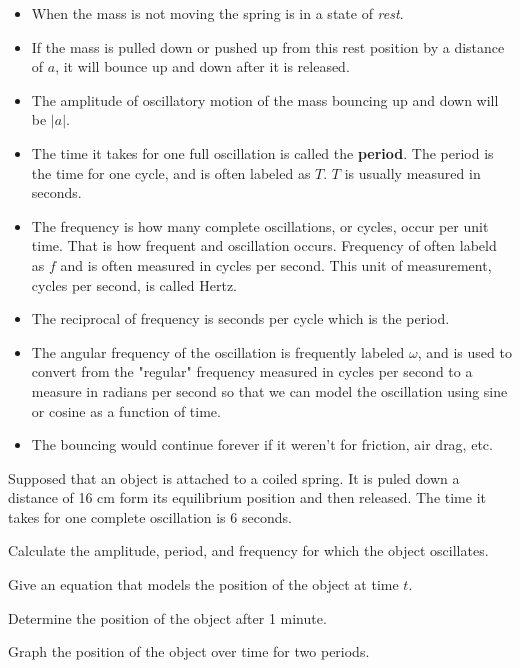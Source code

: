 \documentclass[paper=letter]{article}
\begin{document}
\begin{itemize}
	\item When the mass is not moving the spring is in a state of \emph{rest}.
	\item If the mass is pulled down or pushed up from this rest position by a distance of $a$, it will bounce up and down after it is released.
	\item The amplitude of oscillatory motion of the mass bouncing up and down will be $|a|$.
	\item The time it takes for one full oscillation is called the \textbf{period}.  The period is the time for one cycle, and is often labeled as $T$.  $T$ is usually measured in seconds.
	\item The frequency is how many complete oscillations, or cycles, occur per unit time.  That is how frequent and oscillation occurs.  Frequency of often labeld as $f$ and is often measured in cycles per second.  This unit of measurement, cycles per second, is called Hertz.
	\item The reciprocal of frequency is seconds per cycle which is the period.
	\item The angular frequency of the oscillation is frequently labeled $\omega$, and is used to convert from the "regular" frequency measured in cycles per second to a measure in radians per second so that we can model the oscillation using sine or cosine as a function of time.
	\item The bouncing would continue forever if it weren't for friction, air drag, etc.
\end{itemize}

\newpage

\Prob Supposed that an object is attached to a coiled spring.  It is puled down a distance of 16 cm form its equilibrium position and then released.  The time it takes for one complete oscillation is 6 seconds.\vspace{0.5cm}

\subprob Calculate the amplitude, period, and frequency for which the object oscillates.\vfill

\subprob Give an equation that models the position of the object at time $t$.\vfill

\subprob Determine the position of the object after 1 minute.\vfill

\subprob Graph the position of the object over time for two periods.\vspace{0.5cm}
\end{document}
